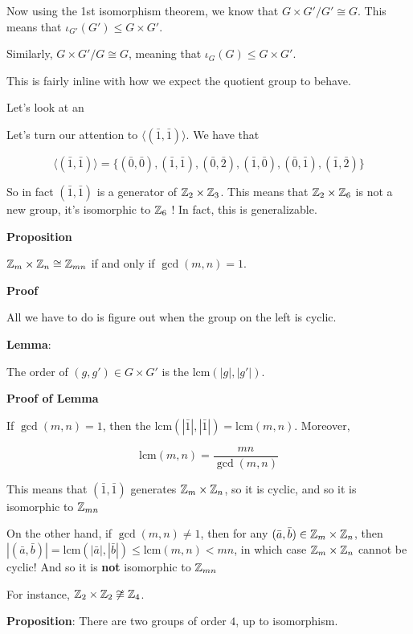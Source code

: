 \documentclass[12pt]{article}
\newcommand{\lcm}{\text{lcm}}
\newcommand{\lr}[1]{\langle #1 \rangle}
\begin{document}
Now using the 1st isomorphism theorem, we know that $G \times G' / G' \cong G$.
This means that $\iota_{G'}(G') \le G \times G'$.

Similarly, $G \times G' / G \cong G$, meaning that $\iota_G(G) \le G \times G'$.

This is fairly inline with how we expect the quotient group to behave.

Let's look at an

\example {
  \[
    \Z_2 \times \Z_3 = \{ (\bar 0, \bar 0), (\bar 1, \bar 0), (\bar 0, \bar 1),
    (\bar 0, \bar 2), (\bar 1, \bar 2) \}
  \]
}

Let's turn our attention to $\lr { (\bar 1, \bar 1) }$. We have that

\[
  \lr { (\bar 1, \bar 1) } = \{ (\bar 0, \bar 0), (\bar 1, \bar 1), (\bar 0, \bar
  2), (\bar 1, \bar 0), (\bar 0, \bar 1), (\bar 1, \bar 2) \}
\]

So in fact $(\bar 1, \bar 1)$ is a generator of ${\mathbb Z}_2 \times {\mathbb Z}_3$. This means
that ${\mathbb Z}_2 \times {\mathbb Z}_6$ is not a new group, it's isomorphic to ${\mathbb Z}_6$ ! In fact,
this is generalizable.

{\bf Proposition}

${\mathbb Z}_m \times {\mathbb Z}_n \cong {\mathbb Z}_{mn}$ if and only if $\gcd(m, n) = 1$.

{\bf Proof}

All we have to do is figure out when the group on the left is cyclic.

{\bf Lemma}:

The order of $(g, g') \in G \times G'$ is the $\lcm(|g|, |g'|)$.

{\bf Proof of Lemma}

If $\gcd(m, n) = 1$, then the $\lcm(|\bar 1|, |\bar 1|) = \lcm(m, n)$. Moreover,

\[
  \lcm(m, n) = \frac{mn}{\gcd(m, n)}
\]

This means that $(\bar 1, \bar 1)$ generates ${\mathbb Z}_m \times {\mathbb Z}_n$, so it is
cyclic, and so it is isomorphic to ${\mathbb Z}_{mn}$

On the other hand, if $\gcd(m, n) \ne 1$, then for any $(\bar a, \bar b) \in
{\mathbb Z}_m \times {\mathbb Z}_n$, then $|(\bar a, \bar b)| = \lcm(|\bar a|, |\bar b|) \le
\lcm(m, n) < mn$, in which case ${\mathbb Z}_m \times {\mathbb Z}_n$ cannot be cyclic! And so it
is {\bf not} isomorphic to ${\mathbb Z}_{mn}$

For instance, ${\mathbb Z}_2 \times {\mathbb Z}_2 \not\cong {\mathbb Z}_4$.

{\bf Proposition}: There are two groups of order $4$, up to isomorphism.
\end{document}
